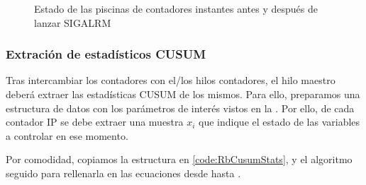 \begin{figure}[htbp]
\centering
{}%
\hfill
{}%

\caption{Estado de las piscinas de contadores instantes antes y después de lanzar SIGALRM}
\end{figure}
%

\subsubsection{Extración de estadísticos CUSUM}

Tras intercambiar los contadores con el/los hilos contadores, el hilo maestro deberá extraer las estadísticas CUSUM de 
los mismos. Para ello, preparamos una estructura de datos con los parámetros de interés vistos en la 
. Por ello, de cada contador IP se debe extraer una muestra $x_i$ que indique el estado de 
las variables a controlar en ese momento.

Por comodidad, copiamos la estructura en \lstlistingname{} \ref{code:RbCusumStats}, y el algoritmo seguido para 
rellenarla en las ecuaciones desde  hasta .

